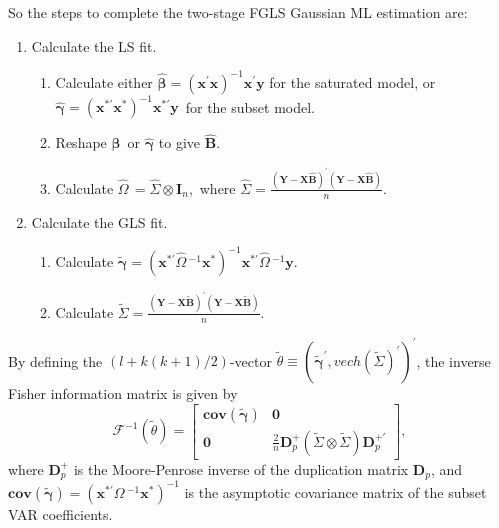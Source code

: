 So the steps to complete the two-stage FGLS Gaussian ML estimation
are:
\begin{enumerate}
\item Calculate the LS fit.

\begin{enumerate}
\item Calculate either $\widehat{\mathbf{\beta}}=\left(\mathbf{x}^{\prime}\mathbf{x}\right)^{-1}\mathbf{x}^{\prime}\mathbf{y}$
for the saturated model, or $\widehat{\mathbf{\gamma}}=\left(\mathbf{x}^{\ast\prime}\mathbf{x}^{\ast}\right)^{-1}\mathbf{x}^{\ast\prime}\mathbf{y}$\ for
the subset model.
\item Reshape $\widehat{\mathbf{\beta}}$\ or $\widehat{\mathbf{\gamma}}$
to give $\widehat{\mathbf{B}}$.
\item Calculate $\widehat{\Omega}\,=\widehat{\Sigma}\otimes\mathbf{I}_{n}$,\ where
$\widehat{\Sigma}=\frac{\left(\mathbf{Y}-\mathbf{X}\widehat{\mathbf{B}}\right)^{\prime}\left(\mathbf{Y}-\mathbf{X}\widehat{\mathbf{B}}\right)}{n}$. 
\end{enumerate}
\item Calculate the GLS fit.

\begin{enumerate}
\item Calculate $\widetilde{\mathbf{\gamma}}=\left(\mathbf{x}^{\ast\prime}\widehat{\Omega}\,^{-1}\mathbf{x}^{\ast}\right)^{-1}\mathbf{x}^{\ast\prime}\widehat{\Omega}\,^{-1}\mathbf{y}$.
\item Calculate $\widetilde{\Sigma}=\frac{\left(\mathbf{Y}-\mathbf{X}\widetilde{\mathbf{B}}\right)^{\prime}\left(\mathbf{Y}-\mathbf{X}\widetilde{\mathbf{B}}\right)}{n}$. 
\end{enumerate}
\end{enumerate}
By defining the $\left(l+k\left(k+1\right)/2\right)$-vector $\widetilde{\theta}\equiv\left(\widetilde{\mathbf{\gamma}}^{\prime},vech\left(\widetilde{\Sigma}\right)^{\prime}\right)^{\prime}$,
the inverse Fisher information matrix is given by
\begin{equation}
\mathcal{F}^{-1}\left(\widetilde{\theta}\right)=\left[\begin{array}{cc}
\mathbf{cov}\left(\widetilde{\mathbf{\gamma}}\right) & \mathbf{0}\\
\mathbf{0} & \frac{2}{n}\mathbf{D}_{p}^{+}\left(\widetilde{\Sigma}\otimes\widetilde{\Sigma}\right)\mathbf{D}_{p}^{+\prime}
\end{array}\right],\label{Normal IFIM}
\end{equation}
where $\mathbf{D}_{p}^{+}$ is the Moore-Penrose inverse of the duplication
matrix $\mathbf{D}_{p}$, and $\mathbf{cov}\left(\widetilde{\mathbf{\gamma}}\right)=\left(\mathbf{x}^{\ast\prime}\Omega\,^{-1}\mathbf{x}^{\ast}\right)^{-1}$
is the asymptotic covariance matrix of the subset VAR coefficients.

